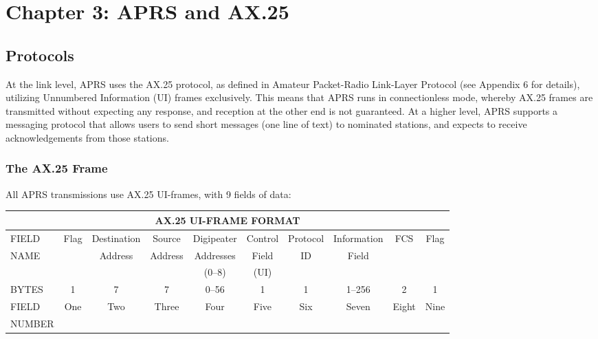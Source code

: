 \chapter{Chapter 3: APRS and AX.25}


\section{Protocols}

At the link level, APRS uses the AX.25 protocol, as defined in Amateur
Packet-Radio Link-Layer Protocol (see Appendix 6 for details), utilizing
Unnumbered Information (UI) frames exclusively. This means that APRS
runs in connectionless mode, whereby AX.25 frames are transmitted without
expecting any response, and reception at the other end is not guaranteed.
At a higher level, APRS supports a messaging protocol that allows users to
send short messages (one line of text) to nominated stations, and expects to
receive acknowledgements from those stations.

\subsection{The AX.25 Frame}

\begin{center}
All APRS transmissions use AX.25 UI-frames, with 9 fields of data:
\end{center}

\begin{tabular}{|l|c|c|c|c|c|c|c|c|c|}
  \hline
  \multicolumn{10}{|c|}{AX.25 UI-FRAME FORMAT} \\
  \hline
  \hline 
  FIELD & Flag & Destination & Source & Digipeater  & Control & Protocol  & Information  & FCS & Flag \\
  NAME & & Address & Address & Addresses & Field  & ID & Field &  &    \\
  &         &         &    & (0--8)     & (UI)   &       &  &  &  \\
  \hline
  BYTES & 1  & 7  & 7  & 0--56 & 1  & 1  & 1--256  & 2  & 1 \\
  \hline
  
  FIELD & One & Two & Three & Four & Five & Six & Seven & Eight & Nine \\
  NUMBER  &     &     &       &      &      &     &       &       &      \\
  
  \hline
\end{tabular}

